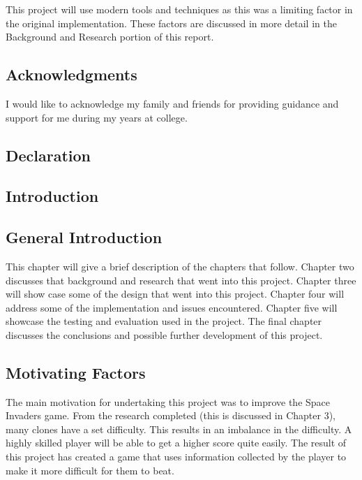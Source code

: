 \documentclass[12pt]{article}
\begin{document}
This project will use modern tools and techniques as this was a limiting factor in the original implementation. These factors are discussed in more detail in the Background and Research portion of this report. 

\newpage
\begin{center}
\section*{Acknowledgments}
\end{center}
I would like to acknowledge my family and friends for providing guidance and support for me during my years at college. 
\newpage
\begin{center}
\section*{Declaration}
\end{center}
\newpage

\begin{center}
\tableofcontents
\end{center}

\newpage
{}



\begin{center}
\section{Introduction}
\end{center}

\begin{center}
\subsection{General Introduction} 
\end{center}
This chapter will give a brief description of the chapters that follow. Chapter two  discusses that background and research that went into this project. Chapter three will show case some of the design that went into this project. Chapter four will address some of the implementation and issues encountered. Chapter five will showcase the testing and evaluation used in the project. The final chapter discusses the conclusions and possible further development of this project.

\begin{center}
\subsection{Motivating Factors}
\end{center}
The main motivation for undertaking this project was to improve the Space Invaders game. From the research completed (this is discussed in Chapter 3), many clones have a set difficulty. This results in an imbalance in the difficulty. A highly skilled player will be able to get a higher score quite easily. The result of this project has created a game that uses information collected by the player to make it more difficult for them to beat. 
\end{document}
